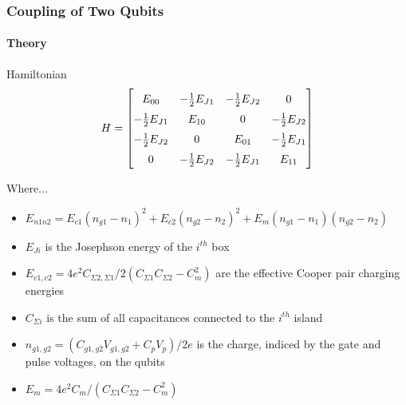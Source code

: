 \documentclass{beamer}
\begin{document}

\begin{frame}
    \frametitle{Coupling of Two Qubits}
    \framesubtitle{Theory}
    \begin{block}{Hamiltonian}
        \fontsize{8}{7.2}\selectfont
        $$
        H=
        \begingroup
            \renewcommand*{\arraystretch}{1.5}
            \begin{bmatrix}
                E_{00} & -\frac{1}{2}E_{J1} & -\frac{1}{2}E_{J2} & 0 \\
                -\frac{1}{2}E_{J1} & E_{10} & 0 & -\frac{1}{2}E_{J2} \\
                -\frac{1}{2}E_{J2} & 0 & E_{01} & -\frac{1}{2}E_{J1} \\
                0 & -\frac{1}{2}E_{J2} & -\frac{1}{2}E_{J1} & E_{11}
            \end{bmatrix}
        \endgroup
        $$
        
        Where...
        \begin{itemize}
            \item $E_{n1n2}=E_{c1}(n_{g1}-n_1)^2 + E_{c2}(n_{g2}-n_2)^2 + E_{m}(n_{g1}-n_1)(n_{g2}-n_2)$
            \item $E_{Ji}$ is the Josephson energy of the $i^{th}$ box
            \item $E_{c1,c2}=4e^2C_{\Sigma 2,\Sigma 1} / 2(C_{\Sigma 1} C_{\Sigma 2} - C_m^2)$ are the effective Cooper pair charging energies
            \item $C_{\Sigma i}$ is the sum of all capacitances connected to the $i^{th}$ island
            \item $n_{g1,g2}=(C_{g1,g2}V_{g1,g2}+C_pV_p)/2e$ is the charge, indiced by the gate and pulse voltages, on the qubits
            \item $E_m=4e^2C_m/(C_{\Sigma 1}C_{\Sigma 2}-C_m^2)$
        \end{itemize}
    \end{block}
\end{frame}

\end{document}

